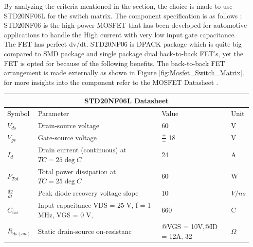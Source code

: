 \noindent By analyzing the criteria mentioned in the section, the choice is made to use STD20NF06L for the switch matrix. The component specification is as follows :
STD20NF06\cite{Switch_MatrixFET_STD20NF06L} is the high-power MOSFET that has been developed for automotive applications to handle the High current with very low input gate capacitance. The FET has perfect dv/dt. STD20NF06 is DPACK package which is quite big compared to SMD package and single package dual back-to-back FET's, yet the FET is opted for because of the following benefits. The back-to-back FET arrangement is made externally as shown in Figure \ref{fig:Mosfet_Switch_Matrix}.
for more insights into the component refer to the MOSFET Datasheet \cite{Switch_MatrixFET_STD20NF06L}.
	


\begin{center}
\begin{tabular}{ |p{5cm}|p{5cm}|p{5cm}|p{5cm}|  }
\hline
\multicolumn{4}{|c|}{STD20NF06L Datasheet} \\
\hline
Symbol& Parameter &Value & Unit \\
\hline
$V_{ds}$  & Drain-source voltage & 60 & V \\
$V_{gs}$  & Gate-source voltage  & $\frac{+}{-}$ 18 & V \\
$I_{d}$   & Drain current (continuous) at $ TC = 25 \deg C$ & 24 & A \\
$P_{Tot}$ & Total power dissipation at $ TC = 25 \deg C$    & 60 & W \\
$\frac{dv}{dt}$ & Peak diode recovery voltage slope    & 10 & $V/ns$ \\
$C_{iss}$ & Input capacitance VDS = 25 V, f = 1 MHz, VGS = 0 V, & 660 & C \\
$R_{ds(on)}$ & Static drain-source on-resistanc & @VGS = 10V,@ID = 12A, 32  & $\Omega$ \\
\hline
\end{tabular}
\end{center}